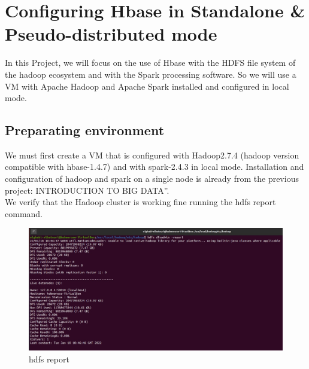 \chapter{Configuring Hbase in Standalone \& Pseudo-distributed mode}
\par In this Project, we will focus on the use of Hbase with the HDFS file system of
the hadoop ecosystem and with the Spark processing software. So we will use a VM with
Apache Hadoop and Apache Spark installed and configured in local mode.
\begin{spacing}{1.2}
\section{Preparating environment }
\par We must first create a VM that is configured with Hadoop2.7.4 (hadoop version compatible with hbase-1.4.7) and with spark-2.4.3 in local mode. Installation and configuration of hadoop and spark on a single node is already from the previous project: INTRODUCTION TO BIG DATA”.\\
We verify that the Hadoop cluster is working fine running the hdfs report command.
\\
\begin{figure}[!htb] 
\begin{center} 
\includegraphics[width=1\linewidth]{Pictures/HBase/Configuring Hbase in Standalone & Pseudo-distributed mode/Preparating environment/hdfs report} 
\end{center} 
\caption{hdfs report} 
\end{figure}  \FloatBarrier
\\

\end{spacing}
